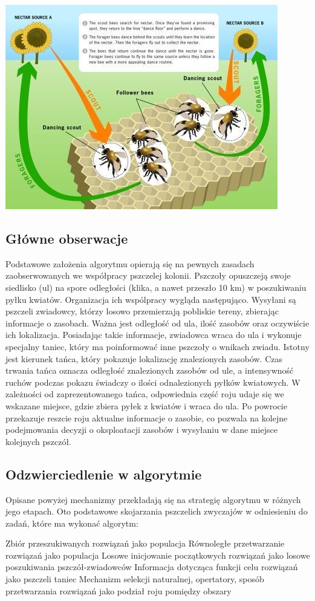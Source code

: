\documentclass[a4paper,12pt,notitlepage]{mwrep}
\begin{document}
\includegraphics{./images/pszczoly.jpeg}

\subsection{Główne obserwacje}
Podstawowe założenia algorytmu opierają się na pewnych zasadach zaobserwowanych we współpracy pszczelej kolonii. Pszczoły opuszczeją swoje siedlisko (ul) na spore odległości (klika, a nawet przeszło 10 km) w poszukiwaniu pyłku kwiatów. Organizacja ich wspólpracy wygląda następująco. Wysyłani są pszczeli zwiadowcy, którzy losowo przemierzają pobliskie tereny, zbierając informacje o zasobach. Ważna jest odległość od ula, ilość zasobów oraz oczywiście ich lokalizacja. Posiadając takie informacje, zwiadowca wraca do ula i wykonuje specjalny taniec, który ma poinformować inne pszczoły o wnikach zwiadu. Istotny jest kierunek tańca, który pokazuje lokalizację znalezionych zasobów. Czas trwania tańca oznacza odległość znalezionych zasobów od ule, a intensywność ruchów podczas pokazu świadczy o ilości odnalezionych pyłków kwiatowych. W zależności od zaprezentowanego tańca, odpowiednia część roju udaje się we wskazane miejsce, gdzie zbiera pyłek z kwiatów i wraca do ula. Po powrocie przekazuje reszcie roju aktualne informacje o zasobie, co pozwala na kolejne podejmowania decyzji o oksploatacji zasobów i wysyłaniu w dane miejsce kolejnych pszczół.

\subsection{Odzwierciedlenie w algorytmie}
Opisane powyżej mechanizmy przekładają się na strategię algorytmu w różnych jego etapach. Oto podstawowe skojarzania pszczelich zwyczajów w odniesieniu do zadań, które ma wykonać algorytm:
\begin{itemize}
	\fe	Zbiór przeszukiwanych rozwiązań jako populacja
	\fe	Równoległe przetwarzanie rozwiązań jako populacja
	\fe	Losowe inicjowanie początkowych rozwiązań jako losowe poszukiwania pszczół-zwiadowców
	\fe	Informacja dotycząca funkcji celu rozwiązań jako pszczeli taniec
	\fe	Mechanizm selekcji naturalnej, opertatory, sposób przetwarzania rozwiązań jako podział roju pomiędzy obszary
\end{itemize}
\end{document}
